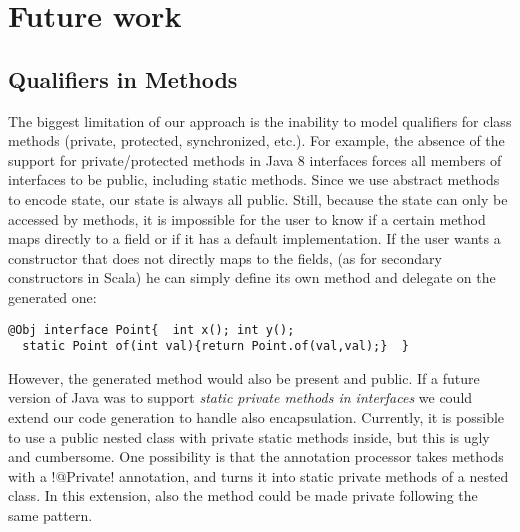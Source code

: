 \section{Future work}\label{sec:futurework}

\subsection{Qualifiers in Methods} %
The biggest limitation of our approach is the inability to model qualifiers
for class methods (private, protected, synchronized, etc.). For example, the absence
of the support for private/protected methods in Java 8 interfaces forces all
members of interfaces to be public, including static methods. Since we use
abstract methods to encode state, our state is always all public. Still, because 
the state can only be accessed by methods, it 
is impossible for the user to know if a certain method maps directly to a field
or if it has a default implementation.  If the user wants a constructor that
does not directly maps to the fields, (as for secondary constructors in Scala)
he can simply define its own \Q@of@ method and delegate on the generated one:
\begin{lstlisting}
@Obj interface Point{  int x(); int y();
  static Point of(int val){return Point.of(val,val);}  }
\end{lstlisting}
However, the generated \Q@of@ method would also be present and public.  If a
future version of Java was to support \emph{static private methods in
  interfaces} we could extend our code generation to handle also encapsulation.
Currently, it is possible to use a public nested class with private static
methods inside, but this is ugly and cumbersome. One possibility is that the
annotation processor takes methods with a \Q!@Private! annotation, and turns it into
static private methods of a nested class. In this extension, also the \Q@of@
method could be made private following the same pattern.

